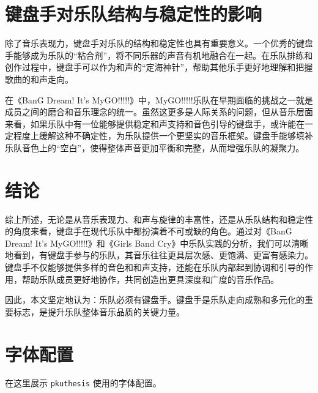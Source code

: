 \documentclass{pkuthesis}
\begin{document}
\section{键盘手对乐队结构与稳定性的影响}
除了音乐表现力，键盘手对乐队的结构和稳定性也具有重要意义。一个优秀的键盘手能够成为乐队的“粘合剂”，将不同乐器的声音有机地融合在一起。在乐队排练和创作过程中，键盘手可以作为和声的“定海神针”，帮助其他乐手更好地理解和把握歌曲的和声走向。

在《BanG Dream! It's MyGO!!!!!》中，MyGO!!!!!乐队在早期面临的挑战之一就是成员之间的磨合和音乐理念的统一。虽然这更多是人际关系的问题，但从音乐层面来看，如果乐队中有一位能够提供稳定和声支持和音色引导的键盘手，或许能在一定程度上缓解这种不确定性，为乐队提供一个更坚实的音乐框架。键盘手能够填补乐队音色上的“空白”，使得整体声音更加平衡和完整，从而增强乐队的凝聚力。

\section{结论}
综上所述，无论是从音乐表现力、和声与旋律的丰富性，还是从乐队结构和稳定性的角度来看，键盘手在现代乐队中都扮演着不可或缺的角色。通过对《BanG Dream! It's MyGO!!!!!》和《Girls Band Cry》中乐队实践的分析，我们可以清晰地看到，有键盘手参与的乐队，其音乐往往更具层次感、更饱满、更富有感染力。键盘手不仅能够提供多样的音色和和声支持，还能在乐队内部起到协调和引导的作用，帮助乐队成员更好地协作，共同创造出更具深度和广度的音乐作品。

因此，本文坚定地认为：乐队必须有键盘手。键盘手是乐队走向成熟和多元化的重要标志，是提升乐队整体音乐品质的关键力量。

\appendix

\section{字体配置}

在这里展示 \verb|pkuthesis| 使用的字体配置。
\end{document}
